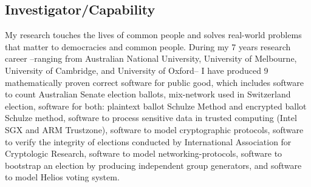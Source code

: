 \documentclass[12pt,a4paper]{article}
\begin{document}
\subsection*{Investigator/Capability}
My research touches the lives of common people and solves
real-world problems that matter to democracies and common people. During my 7 years research career 
--ranging from Australian National University, University of Melbourne, University of Cambridge, 
and University of Oxford-- I have produced 9 mathematically proven correct 
software for public good, which includes software to count Australian Senate election ballots,
mix-network used in Switzerland election, software for both: plaintext ballot Schulze Method and 
encrypted ballot Schulze method, software to process sensitive data in trusted 
computing (Intel SGX and ARM Trustzone), software to model cryptographic protocols, 
software to verify the integrity of elections conducted by International Association for Cryptologic Research, 
software to model networking-protocols, software to bootstrap an election by 
producing independent group generators, and software to model Helios voting system.
\end{document}

